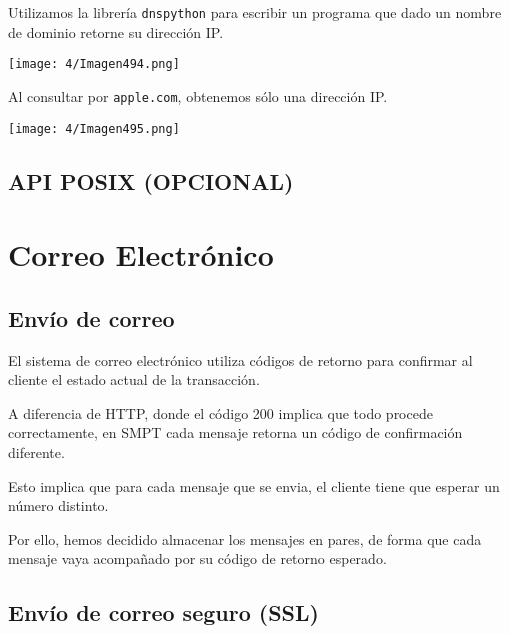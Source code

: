 Utilizamos la librería \verb#dnspython# para escribir un programa que
dado un nombre de dominio retorne su dirección IP{.}

\begin{minipage}{\linewidth}
	\centering
	\texttt{[image: 4/Imagen494.png]}
	\label{fig:4/12}
\end{minipage}

Al consultar por \verb#apple.com#, obtenemos sólo una dirección IP{.}

\begin{minipage}{\linewidth}
	\centering
	\texttt{[image: 4/Imagen495.png]}
	\label{fig:4/13}
\end{minipage}

\subsection{API POSIX (OPCIONAL)}

\section{Correo Electrónico}

\subsection{Envío de correo}

El sistema de correo electrónico utiliza códigos de retorno para confirmar
al cliente el estado actual de la transacción.

A diferencia de HTTP, donde el código 200 implica que todo procede correctamente,
en SMPT cada mensaje retorna un código de confirmación diferente.

Esto implica que para cada mensaje que se envia, el cliente tiene que esperar un
número distinto.


Por ello, hemos decidido almacenar los mensajes en pares,
de forma que cada mensaje vaya acompañado por su código de retorno esperado.

\subsection{Envío de correo seguro (SSL)}

